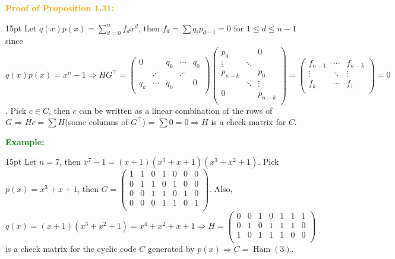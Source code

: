\documentclass[12pt]{article}
\newcommand{\noparskip}{\vspace{-\parskip}}
\newenvironment{dent}
	{\begin{adjustwidth}{15pt}{}\noparskip}
	{\end{adjustwidth}}
\newenvironment{proof}[1]
	{\textcolor{Orange}{\textbf{Proof of #1:}}\begin{dent}}
	{\end{dent}}
\newenvironment{example}
	{\textcolor{Green}{\textbf{Example:}}\begin{dent}}
	{\end{dent}}
\renewcommand{\implies}{\Rightarrow}
\newcommand{\Ham}[1]{\operatorname{Ham}(#1)}
\begin{document}
\begin{proof}{Proposition 1.31}
Let $q(x)p(x) = \sum_{d = 0}^n f_d x^d$, then $f_d = \sum q_i p_{d - i} = 0$ for $1 \le d \le n - 1$ since $q(x)p(x) = x^n - 1 \implies HG^\top = \begin{pmatrix}
   0 &            & q_k &  \cdots & q_0 \\
      & \iddots &       & \iddots &       \\
q_k &  \cdots & q_0 &           &     0 \\
\end{pmatrix} \begin{pmatrix}
        p_0 &           &           0 \\
     \vdots & \ddots &              \\
p_{n - k} &           &        p_0 \\
              & \ddots &     \vdots \\
           0 &           & p_{n - k} \\
\end{pmatrix} = \begin{pmatrix}
f_{n - 1} & \cdots & f_{n - k} \\
    \vdots & \ddots &    \vdots \\
        f_k & \cdots &         f_1 \\
\end{pmatrix} = 0$. Pick $c \in C$, then $c$ can be written as a linear combination of the rows of $G \implies Hc = \sum H$(some columns of $G^\top$) = $\sum 0 = 0 \implies H$ is a check matrix for $C$.
\end{proof}

\begin{example}
Let $n = 7$, then $x^7 - 1 = (x + 1)(x^3 + x + 1)(x^3 + x^2 + 1)$. Pick $p(x) = x^3 + x + 1$, then $G = \begin{pmatrix}
1 & 1 & 0 & 1 & 0 & 0 & 0 \\
0 & 1 & 1 & 0 & 1 & 0 & 0 \\
0 & 0 & 1 & 1 & 0 & 1 & 0 \\
0 & 0 & 0 & 1 & 1 & 0 & 1 \\
\end{pmatrix}$. Also, $q(x) = (x + 1)(x^3 + x^2 + 1) = x^4 + x^2 + x + 1 \implies H = \begin{pmatrix}
0 & 0 & 1 & 0 & 1 & 1 & 1 \\
0 & 1 & 0 & 1 & 1 & 1 & 0 \\
1 & 0 & 1 & 1 & 1 & 0 & 0 \\
\end{pmatrix}$ is a check matrix for the cyclic code $C$ generated by $p(x) \implies C = \Ham{3}$.
\end{example}
\end{document}
